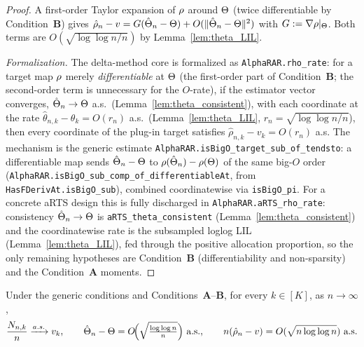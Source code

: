 \begin{proof}\leanok
{}
A first-order Taylor expansion of $\rho$ around $\Theta$ (twice
differentiable by Condition~\textbf{B}) gives
$\hat{\rho}_n - v = G(\hat{\Theta}_n-\Theta) + O(\|\hat{\Theta}_n-\Theta\|^2)$
with $G := \nabla\rho|_\Theta$. Both terms are
$O(\sqrt{\log\log n / n})$ by Lemma~\ref{lem:theta_LIL}.

\emph{Formalization.} The delta-method core is formalized as \texttt{AlphaRAR.rho\_rate}: for a target
map $\rho$ merely \emph{differentiable} at $\Theta$ (the first-order part of Condition~\textbf{B};
the second-order term is unnecessary for the $O$-rate), if the estimator vector converges,
$\hat{\Theta}_n\to\Theta$ a.s.\ (Lemma~\ref{lem:theta_consistent}), with each coordinate at the rate
$\hat\theta_{n,k}-\theta_k = O(r_n)$ a.s.\ (Lemma~\ref{lem:theta_LIL}, $r_n=\sqrt{\log\log n/n}$),
then every coordinate of the plug-in target satisfies $\hat\rho_{n,k}-v_k = O(r_n)$ a.s. The
mechanism is the generic estimate \texttt{AlphaRAR.isBigO\_target\_sub\_of\_tendsto}: a differentiable
map sends $\hat{\Theta}_n-\Theta$ to $\rho(\hat{\Theta}_n)-\rho(\Theta)$ of the same big-$O$ order
(\texttt{AlphaRAR.isBigO\_sub\_comp\_of\_differentiableAt}, from \texttt{HasFDerivAt.isBigO\_sub}),
combined coordinatewise via \texttt{isBigO\_pi}. For a concrete aRTS design this is fully discharged in
\texttt{AlphaRAR.aRTS\_rho\_rate}: consistency $\hat{\Theta}_n\to\Theta$ is
\texttt{aRTS\_theta\_consistent} (Lemma~\ref{lem:theta_consistent}) and the coordinatewise rate is the
subsampled loglog LIL (Lemma~\ref{lem:theta_LIL}), fed through the positive allocation proportion, so
the only remaining hypotheses are Condition~\textbf{B} (differentiability and non-sparsity) and the
Condition~\textbf{A} moments.
\end{proof}

\begin{theorem}\label{thm:LLN}
\leanok
{}
Under the generic conditions and Conditions~\textbf{A}--\textbf{B}, for every
$k\in[K]$, as $n\to\infty$,
\[
  \frac{N_{n,k}}{n}\xrightarrow{a.s.} v_k, \qquad
  \estParams_n - \Params = O\!\Big(\sqrt{\tfrac{\log\log n}{n}}\Big)\ \text{a.s.},\qquad
  n(\hat{\rho}_n - v) = O(\sqrt{n\log\log n})\ \text{a.s.}
\]
\end{theorem}

